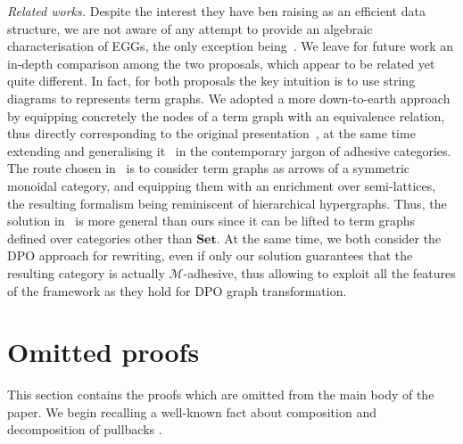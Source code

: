 \documentclass[a4paper,UKenglish,cleveref,pdftex,amsthm,thm-restate,numberwithinsect]{cas-sc}
\theoremstyle{plain}
\theoremstyle{definition}
\newcommand{\Set}{\mathbf{Set}}
\begin{document}
\emph{Related works.}
Despite the interest they have ben raising as an efficient data structure, we are not aware of any attempt to provide an 
algebraic characterisation of EGGs, the only exception being~\cite{ghica}. We leave for future work an in-depth comparison 
among the two proposals, which appear to be related yet quite different.
%
In fact, for both proposals the key intuition is  to use string diagrams to represents term graphs. We adopted a
more down-to-earth approach by equipping
concretely the nodes of a term graph with an equivalence relation, thus directly corresponding to the original presentation~\cite{DetlefsNS05},
at the same time extending and generalising it~\cite{concur2006} in the contemporary jargon of adhesive categories.
The route chosen in~\cite{ghica} is to consider term graphs as arrows of a symmetric monoidal category,
and equipping them with an enrichment over semi-lattices, the resulting formalism being reminiscent of hierarchical hypergraphs.
Thus, the solution in~\cite{ghica}  is  more general than ours since it can be lifted to term graphs defined over categories other than
$\Set$.
%
At the same time, we both consider the DPO approach for rewriting, even if only our solution guarantees that the resulting category
is actually $\mathcal{M}$-adhesive, thus allowing to exploit all the features of the framework
as they hold for DPO graph transformation.

\newpage



\newpage
\appendix

\section{Omitted proofs}

This section contains the proofs which are omitted from the main body of the paper. 
%
We begin recalling  a well-known fact about composition and decomposition of pullbacks \cite[Lem.~1.1]{lack2005adhesive}.
\end{document}

